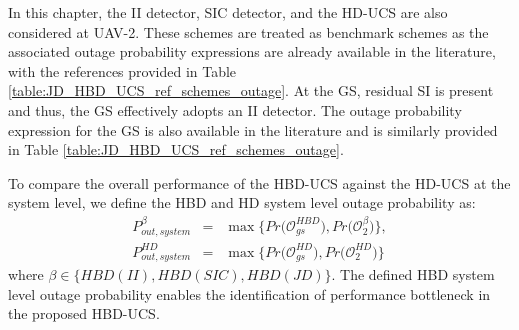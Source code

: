 \begin{table}[]
\centering
\caption{References for the outage probability of the benchmark schemes}
\label{table:JD_HBD_UCS_ref_schemes_outage}
 \vspace{-0.5cm}
\end{table}


In this chapter, the II detector, SIC detector, and the HD-UCS are also considered at UAV-2. These schemes are treated as benchmark schemes as the associated outage probability expressions are already available in the literature, with the references provided in Table \ref{table:JD_HBD_UCS_ref_schemes_outage}. At the GS, residual SI is present and thus, the GS effectively adopts an II detector. The outage probability expression for the GS is also available in the literature and is similarly provided in Table \ref{table:JD_HBD_UCS_ref_schemes_outage}.

To compare the overall performance of the HBD-UCS against the HD-UCS at the system level, we define the HBD and HD system level outage probability as:
\begin{eqnarray}
P_{out,system}^{\beta} & = & \max\big\{Pr\big(\mathcal{O}_{gs}^{HBD}\big),Pr\big(\mathcal{O}_{2}^{\beta}\big)\big\}, \\
P_{out,system}^{HD} & = & \max\big\{Pr\big(\mathcal{O}_{gs}^{HD}\big),Pr\big(\mathcal{O}_{2}^{HD}\big)\big\}
\end{eqnarray}
where $\beta \in \{HBD(II), HBD(SIC), HBD(JD)\}$. The defined HBD system level outage probability enables the identification of performance bottleneck in the proposed HBD-UCS.

